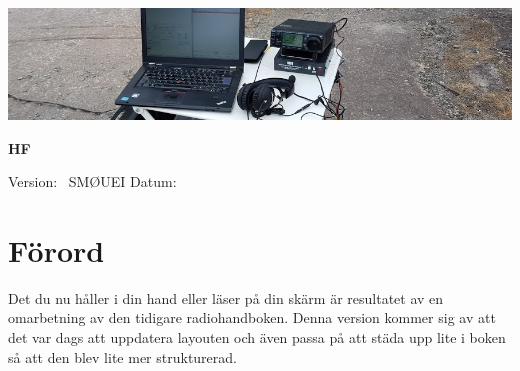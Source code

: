 
	
	
	\pagestyle{empty}
	\vfill
	\vspace*{4cm}
	\centerline{\includegraphics[width=\paperwidth]{logo/rubrikbild}}
	\begin{flushright}
		\Huge{\bfseries{\TitleText} HF} \\[3mm]
		\Large{\bfseries{\SubtitleText}}
	\end{flushright}
	
	\vfill
	
	Version: \DokVersion\ \hfill SMØUEI \hfill Datum: \DokumentDatum
	
	\newpage
	
	
	\pagestyle{fancy}
	\lhead{\leftmark}	
	
	\chead{}
	
	
	\cfoot{\scriptsize \thepage\ / \pageref{LastPage}}
	
	
	\renewcommand{\footrulewidth}{0.2pt}
	
	
	
	\cleardoublepage
	
	\tableofcontents
	
	\newpage
	
	\setlength{\parskip}{0.5em}
	\setlength{\parindent}{0pt}

\section*{Förord}

Det du nu håller i din hand eller läser på din skärm är resultatet av en
omarbetning av den tidigare radiohandboken. Denna version kommer sig av att det
var dags att uppdatera layouten och även passa på att städa upp lite i boken så
att den blev lite mer strukturerad.


